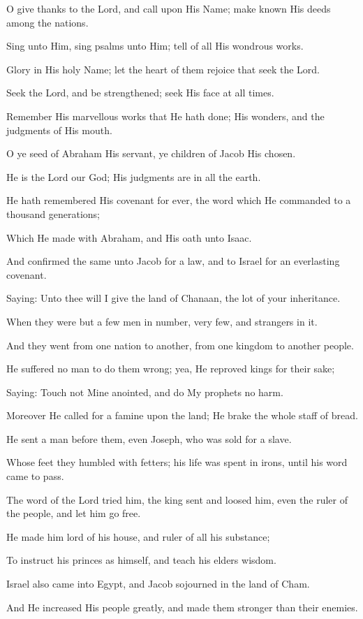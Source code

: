 O give thanks to the Lord, and call upon His Name; make known His deeds among the nations.

Sing unto Him, sing psalms unto Him; tell of all His wondrous works.

Glory in His holy Name; let the heart of them rejoice that seek the Lord.

Seek the Lord, and be strengthened; seek His face at all times.

Remember His marvellous works that He hath done; His wonders, and the judgments of His mouth.

O ye seed of Abraham His servant, ye children of Jacob His chosen.

He is the Lord our God; His judgments are in all the earth.

He hath remembered His covenant for ever, the word which He commanded to a thousand generations;

Which He made with Abraham, and His oath unto Isaac.

And confirmed the same unto Jacob for a law, and to Israel for an everlasting covenant.

Saying: Unto thee will I give the land of Chanaan, the lot of your inheritance.

When they were but a few men in number, very few, and strangers in it.

And they went from one nation to another, from one kingdom to another people.

He suffered no man to do them wrong; yea, He reproved kings for their sake;

Saying: Touch not Mine anointed, and do My prophets no harm.

Moreover He called for a famine upon the land; He brake the whole staff of bread.

He sent a man before them, even Joseph, who was sold for a slave.

Whose feet they humbled with fetters; his life was spent in irons, until his word came to pass.

The word of the Lord tried him, the king sent and loosed him, even the ruler of the people, and let him go free.

He made him lord of his house, and ruler of all his substance;

To instruct his princes as himself, and teach his elders wisdom.

Israel also came into Egypt, and Jacob sojourned in the land of Cham.

And He increased His people greatly, and made them stronger than their enemies.

